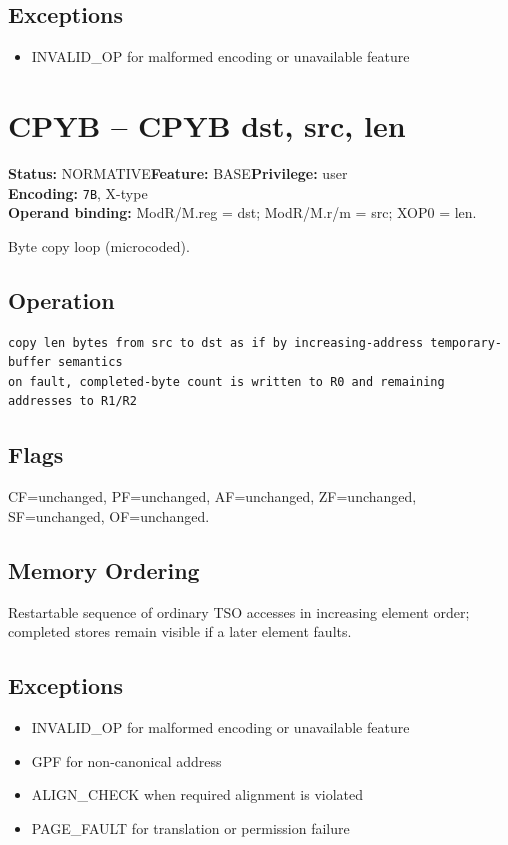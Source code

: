\documentclass[10pt]{article}
\begin{document}
\subsection*{Exceptions}
\begin{itemize}
\item INVALID\_OP for malformed encoding or unavailable feature
\end{itemize}
\clearpage

\section{CPYB -- CPYB dst, src, len}
\textbf{Status:} NORMATIVE\quad \textbf{Feature:} BASE\quad \textbf{Privilege:} user\\
\textbf{Encoding:} \texttt{7B}, X-type\\
\textbf{Operand binding:} ModR/M.reg = dst; ModR/M.r/m = src; XOP0 = len.

Byte copy loop (microcoded).

\subsection*{Operation}
\begin{lstlisting}
copy len bytes from src to dst as if by increasing-address temporary-buffer semantics
on fault, completed-byte count is written to R0 and remaining addresses to R1/R2
\end{lstlisting}
\subsection*{Flags}
CF=unchanged, PF=unchanged, AF=unchanged, ZF=unchanged, SF=unchanged, OF=unchanged.
\subsection*{Memory Ordering}
Restartable sequence of ordinary TSO accesses in increasing element order; completed stores remain visible if a later element faults.
\subsection*{Exceptions}
\begin{itemize}
\item INVALID\_OP for malformed encoding or unavailable feature
\item GPF for non-canonical address
\item ALIGN\_CHECK when required alignment is violated
\item PAGE\_FAULT for translation or permission failure
\end{itemize}
\clearpage
\end{document}
